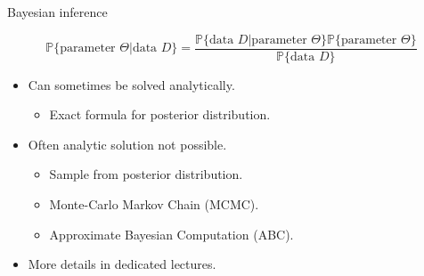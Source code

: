 \documentclass{beamer}
\renewcommand{\P}{\mathbb{P}}
\newcommand{\1}{\ensuremath{\mathbf{1}}}
\begin{document}
%
%
%
\begin{frame}{Bayesian inference}
    \begin{block}{}
        \begin{equation}
            \P \{ \text{parameter }\Theta | \text{data }D \} = \frac{\P \{ \text{data }D | \text{parameter }\Theta \} \P \{\text{parameter }\Theta\}}{\P \{\text{data }D\}}
        \end{equation}
    \end{block}
    \begin{itemize}
        \item Can sometimes be solved analytically.
        \begin{itemize}
            \item Exact formula for posterior distribution.
        \end{itemize}
        \item Often analytic solution not possible.
        \begin{itemize}
            \item Sample from posterior distribution.
            \item Monte-Carlo Markov Chain (MCMC).
            \item Approximate Bayesian Computation (ABC).
        \end{itemize}
        \item More details in dedicated lectures.
    \end{itemize}
\end{frame}
%
%
%
\end{document}
